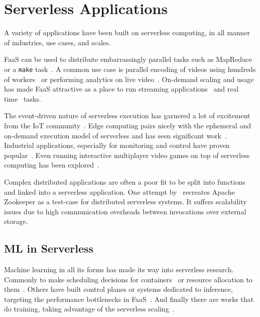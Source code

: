 \section{Serverless Applications}
\label{sec:serverless-apps}

A variety of applications have been built on serverless computing, in all manner of industries, use cases, and scales.

FaaS can be used to distribute embarrassingly parallel tasks such as MapReduce~\cite{jonas2017occupy} or a \texttt{make} task~\cite{fouladi2019laptop}.
A common use case is parallel encoding of videos using hundreds of workers~\cite{ao2018sprocket, zhang2019video} or performing analytics on live video~\cite{romero2021llama, risco2021gpu}.
On-demand scaling and usage has made FaaS attractive as a place to run streaming applications~\cite{konstantoudakis2022serverless,wang2021wearmask,elordi2021demand} and real time~\cite{yan2016building,anand2019low} tasks.

The event-driven nature of serverless execution has garnered a lot of excitement from the IoT community~\cite{benedetti2021experimental,trilles2020iot,hu2020hivemind,persson2017kappa}.
Edge computing pairs nicely with the ephemeral and on-demand execution model of serverless and has seen significant work~\cite{cicconetti2020decentralized,cheng2019fog,wang2020supporting}.
Industrial applications, especially for monitoring and control have proven popular~\cite{hussain2019serverless,mete2021implementation,zhang2021serverless}.
Even running interactive multiplayer video games on top of serverless computing has been explored~\cite{donkervlietservo}.

Complex distributed applications are often a poor fit to be split into functions and linked into a serverless application.
One attempt by~\cite{copik2022faaskeeper} recreates Apache Zookeeper as a test-case for distributed serverless systems. 
It suffers scalability issues due to high communication overheads between invocations over external storage.

\subsection{ML in Serverless}
\label{sec:serverless-ai}

Machine learning in all its forms has made its way into serverless research.
Commonly to make scheduling decisions for containers~\cite{balaji2021fireplace} or resource allocation to them~\cite{mvondo2021ofc,eismann2021sizeless}.
Others have built control planes or systems dedicated to inference, targeting the performance bottlenecks in FaaS~\cite{yang2022infless, ali2022optimizing}.
And finally there are works that do training, taking advantage of the serverless scaling~\cite{wang2019distributed, gimeno2022mlless, xu2021lambdadnn}.


